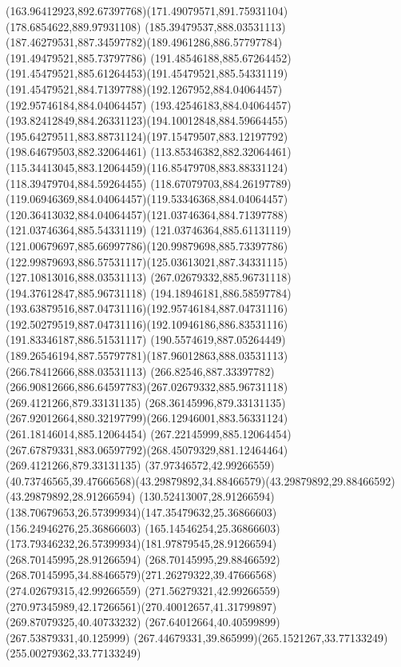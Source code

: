 {{	\curveto(163.96412923,892.67397768)(171.49079571,891.75931104)(178.6854622,889.97931108)
	\moveto(185.39479537,888.03531113)
	\curveto(187.46279531,887.34597782)(189.4961286,886.57797784)(191.49479521,885.73797786)
	\curveto(191.48546188,885.67264452)(191.45479521,885.61264453)(191.45479521,885.54331119)
	\curveto(191.45479521,884.71397788)(192.1267952,884.04064457)(192.95746184,884.04064457)
	\curveto(193.42546183,884.04064457)(193.82412849,884.26331123)(194.10012848,884.59664455)
	\curveto(195.64279511,883.88731124)(197.15479507,883.12197792)(198.64679503,882.32064461)
	\lineto(113.85346382,882.32064461)
	\curveto(115.34413045,883.12064459)(116.85479708,883.88331124)(118.39479704,884.59264455)
	\curveto(118.67079703,884.26197789)(119.06946369,884.04064457)(119.53346368,884.04064457)
	\curveto(120.36413032,884.04064457)(121.03746364,884.71397788)(121.03746364,885.54331119)
	\curveto(121.03746364,885.61131119)(121.00679697,885.66997786)(120.99879698,885.73397786)
	\curveto(122.99879693,886.57531117)(125.03613021,887.34331115)(127.10813016,888.03531113)
	\closepath
	\moveto(267.02679332,885.96731118)
	\lineto(194.37612847,885.96731118)
	\curveto(194.18946181,886.58597784)(193.63879516,887.04731116)(192.95746184,887.04731116)
	\curveto(192.50279519,887.04731116)(192.10946186,886.83531116)(191.83346187,886.51531117)
	\curveto(190.5574619,887.05264449)(189.26546194,887.55797781)(187.96012863,888.03531113)
	\lineto(266.78412666,888.03531113)
	\curveto(266.82546,887.33397782)(266.90812666,886.64597783)(267.02679332,885.96731118)
	\moveto(269.4121266,879.33131135)
	\lineto(268.36145996,879.33131135)
	\curveto(267.92012664,880.32197799)(266.12946001,883.56331124)(261.18146014,885.12064454)
	\lineto(267.22145999,885.12064454)
	\curveto(267.67879331,883.06597792)(268.45079329,881.12464464)(269.4121266,879.33131135)
	\moveto(37.97346572,42.99266559)
	\curveto(40.73746565,39.47666568)(43.29879892,34.88466579)(43.29879892,29.88466592)
	\lineto(43.29879892,28.91266594)
	\lineto(130.52413007,28.91266594)
	\curveto(138.70679653,26.57399934)(147.35479632,25.36866603)(156.24946276,25.36866603)
	\curveto(165.14546254,25.36866603)(173.79346232,26.57399934)(181.97879545,28.91266594)
	\lineto(268.70145995,28.91266594)
	\lineto(268.70145995,29.88466592)
	\curveto(268.70145995,34.88466579)(271.26279322,39.47666568)(274.02679315,42.99266559)
	\lineto(271.56279321,42.99266559)
	\curveto(270.97345989,42.17266561)(270.40012657,41.31799897)(269.87079325,40.40733232)
	\lineto(267.64012664,40.40599899)
	\lineto(267.53879331,40.125999)
	\curveto(267.44679331,39.865999)(265.1521267,33.77133249)(255.00279362,33.77133249)
}}
